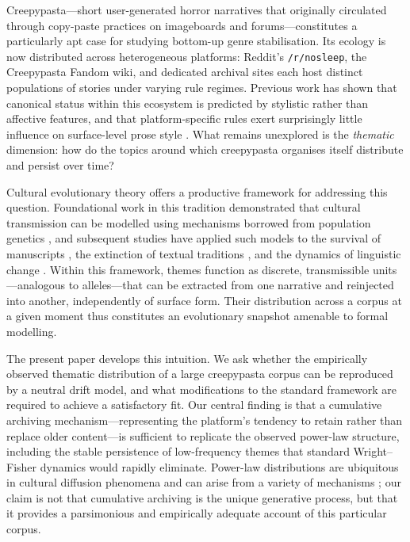 \documentclass{anthology-ch}         %
\begin{document}
Creepypasta---short user-generated horror narratives that originally circulated through copy-paste practices on imageboards and forums---constitutes a particularly apt case for studying bottom-up genre stabilisation. Its ecology is now distributed across heterogeneous platforms: Reddit's \texttt{/r/nosleep}, the Creepypasta Fandom wiki, and dedicated archival sites each host distinct populations of stories under varying rule regimes. 
Previous work has shown that canonical status within this ecosystem is predicted by stylistic rather than affective features, and that platform-specific rules exert surprisingly little influence on surface-level prose style . \cite{lionnet2025makes}
What remains unexplored is the \emph{thematic} dimension: how do the topics around which creepypasta organises itself distribute and persist over time?

Cultural evolutionary theory offers a productive framework for addressing this question. Foundational work in this tradition demonstrated that cultural transmission can be modelled using mechanisms borrowed from population genetics \cite{boyd1988culture}, and subsequent studies have applied such models to the survival of manuscripts \cite{Weitzman1987}, the extinction of textual traditions \cite{kestemont2022forgotten}, and the dynamics of linguistic change \cite{blythe2007stochastic, acerbi2023individual}. Within this framework, themes function as discrete, transmissible units---analogous to alleles---that can be extracted from one narrative and reinjected into another, independently of surface form. Their distribution across a corpus at a given moment thus constitutes an evolutionary snapshot amenable to formal modelling.

The present paper develops this intuition. We ask whether the empirically observed thematic distribution of a large creepypasta corpus can be reproduced by a neutral drift model, and what modifications to the standard framework are required to achieve a satisfactory fit. Our central finding is that a cumulative archiving mechanism---representing the platform's tendency to retain rather than replace older content---is sufficient to replicate the observed power-law structure, including the stable persistence of low-frequency themes that standard Wright--Fisher dynamics would rapidly eliminate. Power-law distributions are ubiquitous in cultural diffusion phenomena and can arise from a variety of mechanisms \cite{newman2006power, simkin2010re}; our claim is not that cumulative archiving is the unique generative process, but that it provides a parsimonious and empirically adequate account of this particular corpus.
\end{document}

